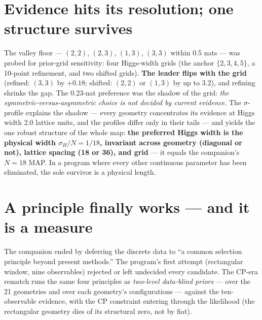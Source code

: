 \documentclass[aps,prd,preprint,nofootinbib]{revtex4-2}
\begin{document}
\section{Evidence hits its resolution; one structure survives}

The valley floor --- $(2,2)$, $(2,3)$, $(1,3)$, $(3,3)$ within 0.5 nats --- was
probed for prior-grid sensitivity: four Higgs-width grids (the anchor
$\{2,3,4,5\}$, a 10-point refinement, and two shifted grids). \textbf{The
leader flips with the grid} (refined: $(3,3)$ by $+0.18$; shifted: $(2,2)$ or
$(1,3)$ by up to 3.2), and refining shrinks the gap. The 0.23-nat preference
was the shadow of the grid: \emph{the symmetric-versus-asymmetric choice is not
decided by current evidence.} The $\sigma$-profile explains the shadow ---
every geometry concentrates its evidence at Higgs width 2.0 lattice units, and
the profiles differ only in their tails --- and yields the one robust structure
of the whole map: \textbf{the preferred Higgs width is the physical width
$\sigma_H/N=1/18$, invariant across geometry (diagonal or not), lattice spacing
(18 or 36), and grid} --- it equals the companion's $N=18$ MAP. In a program
where every other continuous parameter has been eliminated, the sole survivor
is a physical length.

\section{A principle finally works --- and it is a measure}

The companion ended by deferring the discrete data to ``a common selection
principle beyond present methods.'' The program's first attempt (rectangular
window, nine observables) rejected or left undecided every candidate. The
CP-era rematch runs the same four principles as \emph{two-level data-blind
priors} --- over the 21 geometries and over each geometry's configurations ---
against the ten-observable evidence, with the CP constraint entering through
the likelihood (the rectangular geometry dies of its structural zero, not by
fiat).
\end{document}
